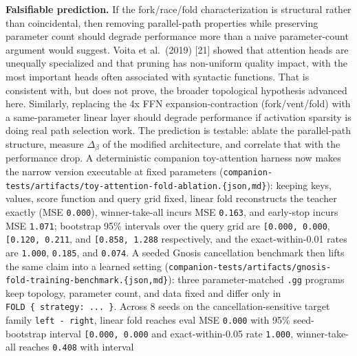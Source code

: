 \documentclass[
  11pt,
]{article}
\begin{document}
\textbf{Falsifiable prediction.} If the fork/race/fold characterization
is structural rather than coincidental, then removing parallel-path
properties while preserving parameter count should degrade performance
more than a naive parameter-count argument would suggest. Voita et
al.~(2019) {[}21{]} showed that attention heads are unequally
specialized and that pruning has non-uniform quality impact, with the
most important heads often associated with syntactic functions. That is
consistent with, but does not prove, the broader topological hypothesis
advanced here. Similarly, replacing the 4x FFN expansion-contraction
(fork/vent/fold) with a same-parameter linear layer should degrade
performance if activation sparsity is doing real path selection work.
The prediction is testable: ablate the parallel-path structure, measure
\(\Delta_\beta\) of the modified architecture, and correlate that with
the performance drop. A deterministic companion toy-attention harness
now makes the narrow version executable at fixed parameters
(\texttt{companion-\allowbreak{}tests/\allowbreak{}artifacts/\allowbreak{}toy-\allowbreak{}attention-\allowbreak{}fold-\allowbreak{}ablation.\allowbreak{}\{json,md\}}):
keeping keys, values, score function and query grid fixed, linear fold
reconstructs the teacher exactly (MSE \texttt{0.000}), winner-take-all
incurs MSE \texttt{0.163}, and early-stop incurs MSE \texttt{1.071};
bootstrap 95\% intervals over the query grid are
\texttt{{[}\textasciigrave{}\textasciigrave{}0.000,\ 0.000\textasciigrave{}\textasciigrave{}{]}},
\texttt{{[}\textasciigrave{}\textasciigrave{}0.120,\ 0.211\textasciigrave{}\textasciigrave{}{]}},
and
\texttt{{[}\textasciigrave{}\textasciigrave{}0.858,\ 1.288\textasciigrave{}\textasciigrave{}{]}}
respectively, and the exact-within-0.01 rates are \texttt{1.000},
\texttt{0.185}, and \texttt{0.074}. A seeded Gnosis cancellation
benchmark then lifts the same claim into a learned setting
(\texttt{companion-\allowbreak{}tests/\allowbreak{}artifacts/\allowbreak{}gnosis-\allowbreak{}fold-\allowbreak{}training-\allowbreak{}benchmark.\allowbreak{}\{json,md\}}):
three parameter-matched \texttt{.gg} programs keep topology, parameter
count, and data fixed and differ only in
\texttt{FOLD\ \{\ strategy:\ ...\ \}}. Across 8 seeds on the
cancellation-sensitive target family \texttt{left\ -\ right}, linear
fold reaches eval MSE \texttt{0.000} with 95\% seed-bootstrap interval
\texttt{{[}\textasciigrave{}\textasciigrave{}0.000,\ 0.000\textasciigrave{}\textasciigrave{}{]}}
and exact-within-0.05 rate \texttt{1.000}, winner-take-all reaches
\texttt{0.408} with interval
\end{document}
